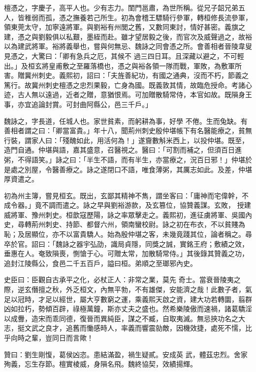 \begin{pinyinscope}
 檀憑之，字慶子，高平人也。少有志力。閨門邕肅，為世所稱。從兄子韶兄弟五人，皆稚弱而孤，憑之撫養若己所生。初為會稽王驃騎行參軍，轉桓修長流參軍，領東莞太守，加寧遠將軍。與劉裕有州閭之舊，又數同東討，情好甚密。義旗之建，憑之與劉毅俱以私艱，墨絰而赴。雖才望居毅之後，而官次及威聲過之，故裕以為建武將軍。裕將義舉也，嘗與何無忌、魏詠之同會憑之所。會善相者晉陵韋叟見憑之，大驚曰：「卿有急兵之厄，其候不
 過三四日耳。且深藏以避之，不可輕出。」及桓玄將皇甫敷之至羅落橋也，憑之與裕各領一隊而戰，軍敗，為敷軍所害。贈冀州刺史。義熙初，詔曰：「夫旌善紀功，有國之通典，沒而不朽，節義之篤行。故冀州刺史檀憑之忠烈果毅，亡身為國。既義敦其情，故臨危授命。考諸心迹，古人無以遠過，近者之贈，意猶恨焉。可加贈散騎常侍，本官如故。既隕身王事，亦宜追論封賞。可封曲阿縣公，邑三千戶。」



 魏詠之，字長道，任城人也。家世貧素，而躬耕為事，好學
 不倦。生而兔缺。有善相者謂之曰：「卿當富貴。」年十八，聞荊州刺史殷仲堪帳下有名醫能療之，貧無行裝，謂家人曰：「殘醜如此，用活何為！」遂齎數斛米西上，以投仲堪。既至，造門自通。仲堪與語，嘉其盛意，召醫視之。醫曰：「可割而補之，但須百日進粥，不得語笑。」詠之曰：「半生不語，而有半生，亦當療之，況百日邪！」仲堪於是處之別屋，令醫善療之。詠之遂閉口不語，唯食薄粥，其厲志如此。及差，仲堪厚資遣之。



 初為州主簿，嘗見桓玄。既出，玄鄙其精神不雋，謂坐客曰：「庸神而宅偉幹，不成令器。」竟不調而遣之。詠之早與劉裕游款，及玄篡位，協贊義謀。玄敗，
 授建威將軍、豫州刺史。桓歆寇歷陽，詠之率眾擊走之。義熙初，進征虜將軍、吳國內史，尋轉荊州刺史、持節、都督六州，領南蠻校尉。詠之初在布衣，不以貧賤為恥；及居顯位，亦不以富貴驕人。始為殷仲堪之客，未幾竟踐其位，論者稱之。尋卒於官。詔曰：「魏詠之器宇弘劭，識局貞隱，同獎之誠，實銘王府；敷績之效，垂惠在人。奄致隕喪，惻愴于心。可贈太常，加散騎常侍。」其後錄其贊義之功，追封江陵縣公，食邑二千五百戶，謚曰桓。弟順之至瑯邪內史。



 史臣曰：臣觀自古承平之化，必杖正人：非常之業，莫先
 奇士。當衰晉陵夷之際，逆玄僭擅之秋，外乏桓文，內無平勃，不有雄傑，安能濟之哉！此數子者，氣足以冠時，才足以經世，屬大亨數窮之運，乘義熙天啟之資，建大功若轉圜，翦群凶如拉朽，勢傾百辟，祿極萬鐘，斯亦丈夫之盛也。然希樂陵傲而速禍，諸葛驕淫以成釁，造宋而乖同德，復晉而異純臣，謀之不臧，自取夷滅。無忌挾功名之大志，挺文武之良才，追舊而慟感時人，率義而響震勍敵，因機效捷，處死不懦，比乎向時之輩，豈同日而言歟！



 贊曰：劉生剛愎，葛侯凶恣。患結滿盈，禍生疑貳。安成英
 武，體茲忠烈。舍家殉義，忘生存節。檀實棱威，身隕名飛。魏終協契，效績揚輝。



\end{pinyinscope}